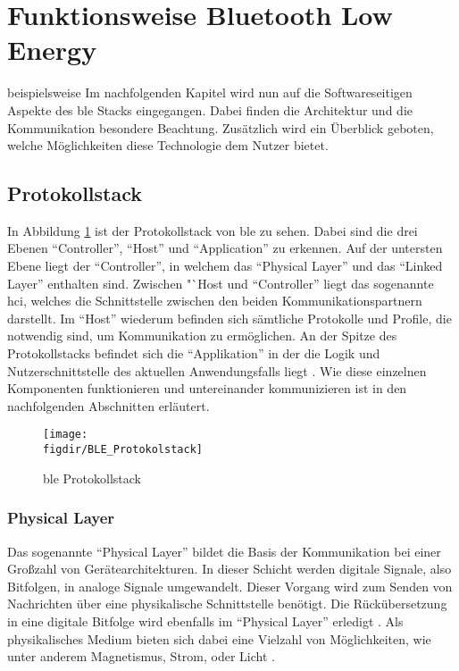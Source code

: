 \section{Funktionsweise Bluetooth Low Energy}
\label{s:funktionsweise}
beispielsweise
Im nachfolgenden Kapitel wird nun auf die Softwareseitigen Aspekte des \ac{ble} Stacks eingegangen. Dabei finden die Architektur und die Kommunikation besondere Beachtung. Zusätzlich wird ein Überblick geboten, welche Möglichkeiten diese Technologie dem Nutzer bietet.\\  

\subsection{Protokollstack}
\label{ss:funktionsweise:protokollstack}

In Abbildung \ref{FIG:protokollstack} ist der Protokollstack von \ac{ble} zu sehen. Dabei sind die drei Ebenen "`Controller"', "`Host"' und "`Application"' zu erkennen. Auf der untersten Ebene liegt der "`Controller"', in welchem das "`Physical Layer"' und das "`Linked Layer"' enthalten sind. Zwischen "`Host und "`Controller"' liegt das sogenannte \ac{hci}, welches die Schnittstelle zwischen den beiden Kommunikationspartnern darstellt. Im "`Host"' wiederum befinden sich sämtliche Protokolle und Profile, die notwendig sind, um Kommunikation zu ermöglichen. An der Spitze des Protokollstacks befindet sich die "`Applikation"' in der die Logik und Nutzerschnittstelle des aktuellen Anwendungsfalls liegt \cite[15]{Townsend14:GSB}. Wie diese einzelnen Komponenten funktionieren und untereinander kommunizieren ist in den nachfolgenden Abschnitten erläutert.\\  
 
\begin{figure}[h]
\centering
\texttt{[image: \\figdir/BLE\_Protokolstack]}
\caption{\ac{ble} Protokollstack \cite[Seite 16]{Townsend14:GSB}}
\label{FIG:protokollstack}
\end{figure}

\subsubsection{Physical Layer}
\label{sss:funktionsweise:physical}

Das sogenannte "`Physical Layer"' bildet die Basis der Kommunikation bei einer Großzahl von Gerätearchitekturen. In dieser Schicht werden digitale Signale, also Bitfolgen, in analoge Signale umgewandelt. Dieser Vorgang wird zum Senden von Nachrichten über eine physikalische Schnittstelle benötigt. Die Rückübersetzung in eine digitale Bitfolge wird ebenfalls im "`Physical Layer"' erledigt \cite[Seite 16]{Townsend14:GSB}. Als physikalisches Medium bieten sich dabei eine Vielzahl von Möglichkeiten, wie unter anderem Magnetismus, Strom, oder Licht \cite[Seite 95 - 101]{Tanenbaum14:CN}.\\

